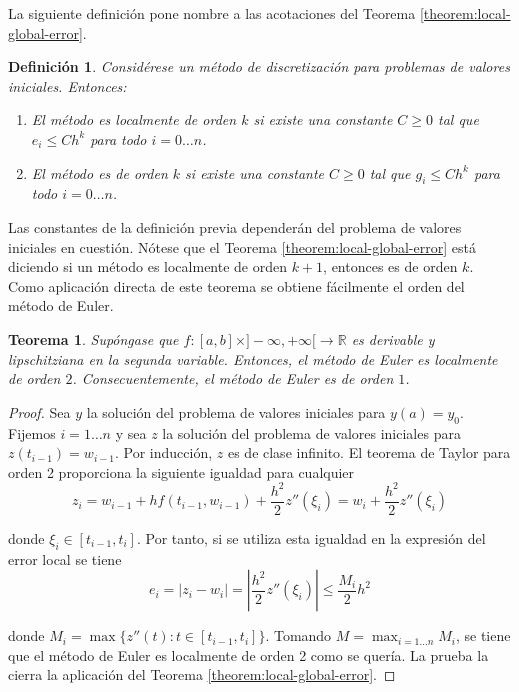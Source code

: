 \documentclass{article}
\theoremstyle{theorem-style}  %
\newtheorem{theorem}{Teorema}[section]  %
\theoremstyle{definition-style}
\newtheorem{definition}{Definición}[section]
\theoremstyle{example-style}
\begin{document}
	La siguiente definición pone nombre a las acotaciones del Teorema \ref{theorem:local-global-error}.
	
	\begin{definition} 
		Considérese un método de discretización para problemas de valores iniciales. Entonces:
		\begin{enumerate}
			\item El método es localmente de orden $k$ si existe una constante $C \ge 0$ tal que $e_i \le C h^k$ para todo $i = 0 \ldots n$.
			\item El método es de orden $k$ si existe una constante $C \ge 0$ tal que $g_i \le C h^k$ para todo $i = 0 \ldots n$.
		\end{enumerate}
	\end{definition}
	
	Las constantes de la definición previa dependerán del problema de valores iniciales en cuestión. Nótese que el Teorema \ref{theorem:local-global-error} está diciendo si un método es localmente de orden $k+1$, entonces es de orden $k$. Como aplicación directa de este teorema se obtiene fácilmente el orden del método de Euler.
	
	\begin{theorem}
		Supóngase que $f: [a,b] \times ]-\infty, +\infty[ \rightarrow \mathbb{R}$ es derivable y lipschitziana en la segunda variable. Entonces, el método de Euler es localmente de orden $2$. Consecuentemente, el método de Euler es de orden $1$.
	\end{theorem}
	
	\begin{proof}
		Sea $y$ la solución del problema de valores iniciales para $y(a) = y_0$. Fijemos $i = 1 \ldots n$ y sea $z$ la solución del problema de valores iniciales para $z(t_{i-1}) = w_{i-1}$. Por inducción, $z$ es de clase infinito. El teorema de Taylor para orden 2 proporciona la siguiente igualdad para cualquier 
		\begin{equation}
			z_i= w_{i-1} + h f(t_{i-1}, w_{i-1}) + \frac{h^2}{2} z''(\xi_i) = w_i + \frac{h^2}{2} z''(\xi_i)
		\end{equation}

		donde $\xi_i \in [t_{i-1}, t_i]$. Por tanto, si se utiliza esta igualdad en la expresión del error local se tiene
		\begin{equation}
			e_i = |z_i - w_i| = \left|\frac{h^2}{2} z''(\xi_i)\right| \le \frac{M_i}{2} h^2
		\end{equation}

		donde $M_i = \max\{z''(t) : t \in [t_{i-1}, t_i]\}$. Tomando $M = \max_{i = 1 \ldots n} M_i$, se tiene que el método de Euler es localmente de orden 2 como se quería. La prueba la cierra la aplicación del Teorema \ref{theorem:local-global-error}.
	\end{proof}
	
\end{document}
